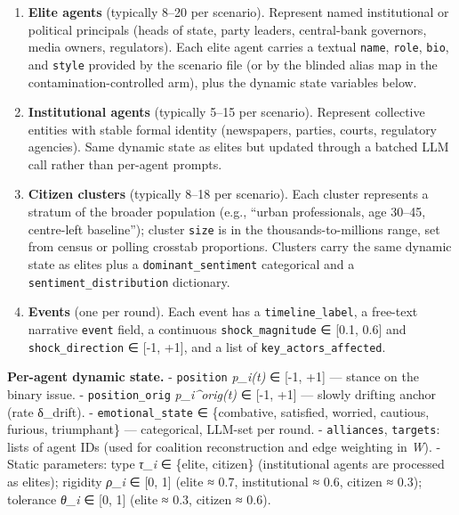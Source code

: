 \documentclass[
]{article}
\begin{document}
\begin{enumerate}
\def\labelenumi{\arabic{enumi}.}
\item
  \textbf{Elite agents} (typically 8--20 per scenario). Represent named
  institutional or political principals (heads of state, party leaders,
  central-bank governors, media owners, regulators). Each elite agent
  carries a textual \texttt{name}, \texttt{role}, \texttt{bio}, and
  \texttt{style} provided by the scenario file (or by the blinded alias
  map in the contamination-controlled arm), plus the dynamic state
  variables below.
\item
  \textbf{Institutional agents} (typically 5--15 per scenario).
  Represent collective entities with stable formal identity (newspapers,
  parties, courts, regulatory agencies). Same dynamic state as elites
  but updated through a batched LLM call rather than per-agent prompts.
\item
  \textbf{Citizen clusters} (typically 8--18 per scenario). Each cluster
  represents a stratum of the broader population (e.g., ``urban
  professionals, age 30--45, centre-left baseline''); cluster
  \texttt{size} is in the thousands-to-millions range, set from census
  or polling crosstab proportions. Clusters carry the same dynamic state
  as elites plus a \texttt{dominant\_sentiment} categorical and a
  \texttt{sentiment\_distribution} dictionary.
\item
  \textbf{Events} (one per round). Each event has a
  \texttt{timeline\_label}, a free-text narrative \texttt{event} field,
  a continuous \texttt{shock\_magnitude} ∈ {[}0.1, 0.6{]} and
  \texttt{shock\_direction} ∈ {[}-1, +1{]}, and a list of
  \texttt{key\_actors\_affected}.
\end{enumerate}

\textbf{Per-agent dynamic state.} - \texttt{position} \emph{p\_i(t)} ∈
{[}-1, +1{]} --- stance on the binary issue. - \texttt{position\_orig}
\emph{p\_i\^{}orig(t)} ∈ {[}-1, +1{]} --- slowly drifting anchor (rate
δ\_drift). - \texttt{emotional\_state} ∈ \{combative, satisfied,
worried, cautious, furious, triumphant\} --- categorical, LLM-set per
round. - \texttt{alliances}, \texttt{targets}: lists of agent IDs (used
for coalition reconstruction and edge weighting in \emph{W}). - Static
parameters: type \emph{τ\_i} ∈ \{elite, citizen\} (institutional agents
are processed as elites); rigidity \emph{ρ\_i} ∈ {[}0, 1{]} (elite ≈
0.7, institutional ≈ 0.6, citizen ≈ 0.3); tolerance \emph{θ\_i} ∈ {[}0,
1{]} (elite ≈ 0.3, citizen ≈ 0.6).
\end{document}
